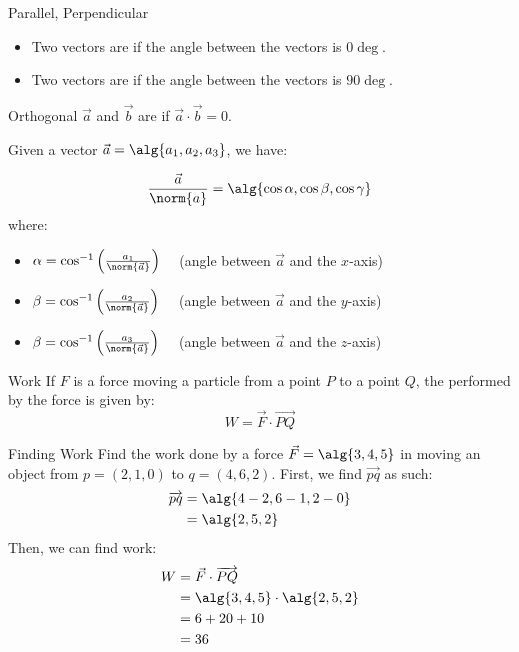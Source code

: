 \documentclass[12pt]{report}
\begin{document}
\begin{dfnbox}{Parallel, Perpendicular}{}
    \begin{itemize}[noitemsep]
        \item Two vectors are  if the angle between the vectors is $0\deg$.
        \item Two vectors are  if the angle between the vectors is $90\deg$.
    \end{itemize}
\end{dfnbox}

\begin{dfnbox}{Orthogonal}{}
    $\vec{a}$ and $\vec{b}$ are  if $\vec{a} \cdot \vec{b} = 0$.
\end{dfnbox}

Given a vector $\vec{a} = \alg{a_1, a_2, a_3}$, we have:

\[ \frac{\vec{a}}{\norm{a}} = \alg{\cos \alpha, \cos \beta, \cos \gamma} \]
where:
\begin{itemize}
    \item $\alpha = \cos^{-1} \left( \frac{a_1}{\norm{\vec{a}}} \right) \quad$ (angle between $\vec{a}$ and the $x$-axis)
    \item $\beta = \cos^{-1} \left( \frac{a_2}{\norm{\vec{a}}} \right) \quad$ (angle between $\vec{a}$ and the $y$-axis)
    \item $\beta = \cos^{-1} \left( \frac{a_3}{\norm{\vec{a}}} \right) \quad$ (angle between $\vec{a}$ and the $z$-axis)
\end{itemize}

\begin{dfnbox}{Work}{}
    If $F$ is a force moving a particle from a point $P$ to a point $Q$, the  performed by the force is given by:
    \[ W = \vec{F} \cdot \overrightarrow{PQ} \]
\end{dfnbox}

\begin{exbox}{Finding Work}{}
    Find the work done by a force $\vec{F} = \alg{3,4,5}$ in moving an object from $p = (2,1,0)$ to $q = (4,6,2)$.
    \tcblower
    First, we find $\overrightarrow{pq}$ as such:
    \begin{align*}
        \overrightarrow{pq}
        &= \alg{4-2, 6-1, 2-0} \\
        &= \alg{2,5,2}
    \end{align*}
    Then, we can find work:
    \begin{align*}
        W
        &= \vec{F} \cdot \overrightarrow{PQ} \\
        &= \alg{3,4,5} \cdot \alg{2,5,2} \\
        &= 6 + 20 + 10 \\
        &= 36
    \end{align*}
\end{exbox}
\end{document}
